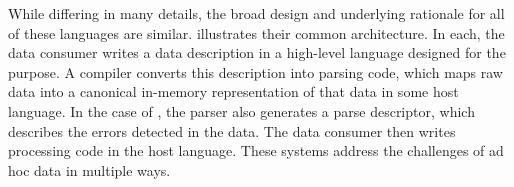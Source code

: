 


While differing in many details, the broad design and underlying rationale 
for all of these languages are similar. 
 illustrates their common architecture.
In each, the data consumer writes a data description in a high-level language designed for the purpose.  A compiler converts this description into parsing code, which maps raw data into a canonical in-memory representation of that data in some host language.  In the case of \pads{}, the parser also generates a parse descriptor, which describes the errors detected in the data.  The data consumer then writes processing code in the host language.  
These systems address the challenges of ad hoc data in multiple ways.  

